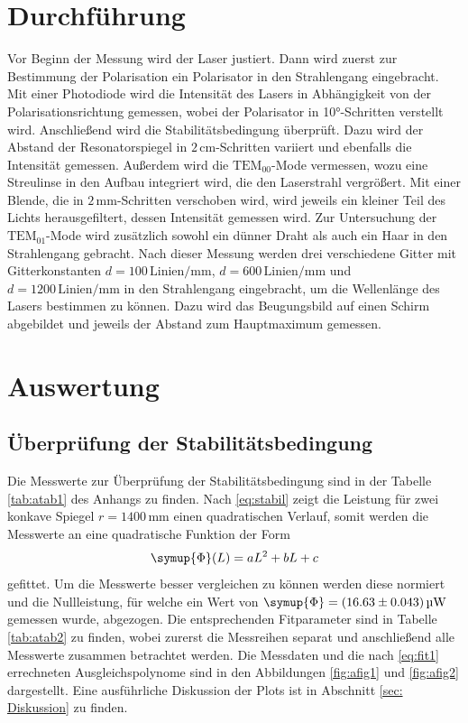 \section{Durchführung}
Vor Beginn der Messung wird der Laser justiert. 
Dann wird zuerst zur Bestimmung der Polarisation ein Polarisator in den Strahlengang eingebracht. Mit einer Photodiode
wird die Intensität des Lasers in Abhängigkeit von der Polarisationsrichtung gemessen, wobei der Polarisator in
10°-Schritten verstellt wird. 
Anschließend wird die Stabilitätsbedingung überprüft. Dazu wird der Abstand der Resonatorspiegel in $2 \, \si{\centi\meter}$-Schritten
variiert und ebenfalls die Intensität gemessen. 
Außerdem wird die $\text{TEM}_{00}$-Mode vermessen, wozu eine Streulinse in den Aufbau integriert wird, die den Laserstrahl vergrößert.
Mit einer Blende, die in $2 \, \si{\milli\meter}$-Schritten verschoben wird, wird jeweils ein kleiner Teil des Lichts 
herausgefiltert, dessen Intensität gemessen wird. 
Zur Untersuchung der $\text{TEM}_{01}$-Mode wird zusätzlich sowohl ein dünner Draht als auch ein Haar in den Strahlengang gebracht.
Nach dieser Messung werden drei verschiedene Gitter mit Gitterkonstanten $d = 100 \, \text{Linien} / \si{\milli\meter}$, $d = 600 \, \text{Linien} / \si{\milli\meter}$ und $d = 1200 \, \text{Linien} / \si{\milli\meter}$
in den Strahlengang eingebracht, um die Wellenlänge des Lasers bestimmen zu können. Dazu wird das Beugungsbild 
auf einen Schirm abgebildet und jeweils der Abstand zum Hauptmaximum gemessen.


\section{Auswertung}
\subsection{Überprüfung der Stabilitätsbedingung}
Die Messwerte zur Überprüfung der Stabilitätsbedingung sind in der Tabelle \ref{tab:atab1} des Anhangs zu finden.
Nach \eqref{eq:stabil} zeigt die Leistung für zwei konkave Spiegel $r=1400\,\si{\mm}$ einen quadratischen Verlauf, somit werden die Messwerte an eine quadratische Funktion der Form
\begin{equation}
    \symup{\Phi}(L) = a L^2 + b L + c \label{eq:fit1}
\end{equation}
gefittet. 
Um die Messwerte besser vergleichen zu können werden diese normiert und die Nullleistung, für welche ein Wert von $\symup{\Phi} = (16.63 \pm 0.043) \, \si{\micro\W}$ gemessen wurde, abgezogen.
Die entsprechenden Fitparameter sind in Tabelle \ref{tab:atab2} zu finden, wobei zurerst die Messreihen separat und anschließend alle Messwerte zusammen betrachtet werden. 
Die Messdaten und die nach \eqref{eq:fit1} errechneten Ausgleichspolynome sind in den Abbildungen \ref{fig:afig1} und \ref{fig:afig2} dargestellt.
Eine ausführliche Diskussion der Plots ist in Abschnitt \ref{sec: Diskussion} zu finden.

